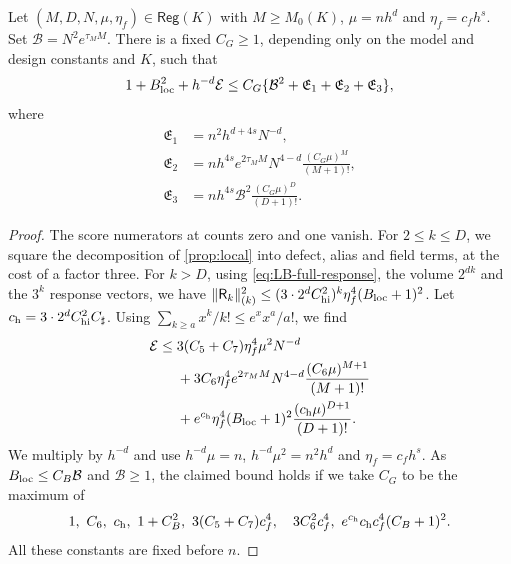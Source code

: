 \begin{lemma}\label{lem:raw-energy}
Let $(M,D,N,\mu,\eta_f)\in\mathsf{Reg}(K)$ with $M\ge M_0(K)$,
$\mu=nh^d$ and $\eta_f=c_fh^s$. Set $\mathcal B=N^2e^{\tau_MM}$.
There is a fixed $C_G\ge1$, depending only on the model and design
constants and $K$, such that
\begin{equation}\label{eq:LB-raw-energy}
 1+B_{\rm loc}^2+h^{-d}\mathcal E
 \le C_G\{\mathcal B^2+\mathfrak E_1+\mathfrak E_2+\mathfrak E_3\},
\end{equation}
where
\begin{equation}\label{eq:LB-terms}
\begin{aligned}
 \mathfrak E_1&=n^2h^{d+4s}N^{-d},\\
 \mathfrak E_2&=n h^{4s}e^{2\tau_MM}N^{4-d}
                    \frac{(C_G\mu)^M}{(M+1)!},\\
 \mathfrak E_3&=n h^{4s}\mathcal B^2
                    \frac{(C_G\mu)^D}{(D+1)!}.
\end{aligned}
\end{equation}
\end{lemma}

\begin{proof}
The score numerators at counts zero and one vanish. For $2\le k\le D$, we square the
decomposition of \cref{prop:local} into defect, alias and field terms,
at the cost of a factor three. For $k>D$, using
\eqref{eq:LB-full-response}, the volume $2^{dk}$ and the $3^k$ response
vectors, we have
$\|\mathsf R_k\|_{(k)}^2\le(3\cdot2^dC_{\rm hi}^2)^k
\eta_f^4(B_{\rm loc}+1)^2$. Let
$c_{\rm h}=3\cdot2^dC_{\rm hi}^2C_\sharp$. Using
$\sum_{k\ge a}x^k/k!\le e^xx^a/a!$, we find
\[
\begin{aligned}
 \mathcal E\le{}&3(C_5+C_7)\eta_f^4\mu^2N^{-d}\\
 &+3C_6\eta_f^4e^{2\tau_MM}N^{4-d}
                          \frac{(C_6\mu)^{M+1}}{(M+1)!}\\
 &+e^{c_{\rm h}}\eta_f^4(B_{\rm loc}+1)^2
                          \frac{(c_{\rm h}\mu)^{D+1}}{(D+1)!}.
\end{aligned}
\]
We multiply by $h^{-d}$ and use $h^{-d}\mu=n$,
$h^{-d}\mu^2=n^2h^d$ and $\eta_f=c_fh^s$.
As $B_{\rm loc}\le C_B\mathcal B$ and $\mathcal B\ge1$, the claimed
bound holds if we take $C_G$ to be the maximum of
\[
 1,\ C_6,\ c_{\rm h},\ 1+C_B^2,\ 3(C_5+C_7)c_f^4,\quad
 3C_6^2c_f^4,\ e^{c_{\rm h}}c_{\rm h}c_f^4(C_B+1)^2.
\]
All these constants are fixed before $n$.
\end{proof}


